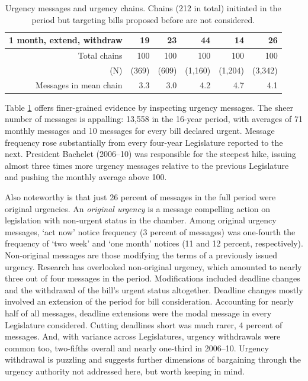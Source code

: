 \documentclass[letter,12pt]{article}
\begin{document}
\begin{table}
\begin{tabular}{rrrrr|r}
1 month, extend, withdraw & 19 & 23 & 44 & 14 &  26  \\ \hline
Total chains              & 100 & 100 & 100 & 100 & 100  \\
(N)                       & (369) & (609) & (1,160) & (1,204) &(3,342) \\ 
Messages in mean chain    & 3.3   & 3.0   & 4.2     & 4.7     & 4.1 \\ \hline
\end{tabular}
\caption{Urgency messages and urgency chains. Chains (212 in total) initiated in the period but targeting bills proposed before are not considered.}\label{t:freqUrg}
\end{table}

Table \ref{t:freqUrg} offers finer-grained evidence by inspecting urgency messages. The sheer number of messages is appalling: 13,558 in the 16-year period, with averages of 71 monthly messages and 10 messages for every bill declared urgent. Message frequency rose substantially from every four-year Legislature reported to the next. President Bachelet (2006--10) was responsible for the steepest hike, issuing almost three times more urgency messages relative to the previous Legislature and pushing the monthly average above 100. 

Also noteworthy is that just 26 percent of messages in the full period were original urgencies. An \emph{original urgency} is a message compelling action on legislation with non-urgent status in the chamber. Among original urgency messages, `act now' notice frequency (3 percent of messages) was one-fourth the frequency of `two week' and `one month' notices (11 and 12 percent, respectively). Non-original messages are those modifying the terms of a previously issued urgency. Research has overlooked non-original urgency, which amounted to nearly three out of four messages in the period. Modifications included deadline changes and the withdrawal of the bill's urgent status altogether. Deadline changes mostly involved an extension of the period for bill consideration. Accounting for nearly half of all messages, deadline extensions were the modal message in every Legislature considered. Cutting deadlines short was much rarer, 4 percent of messages. And, with variance across Legislatures, urgency withdrawals were common too, two-fifths overall and nearly one-third in 2006--10. Urgency withdrawal is puzzling and suggests further dimensions of bargaining through the urgency authority not addressed here, but worth keeping in mind. 
\end{document}
